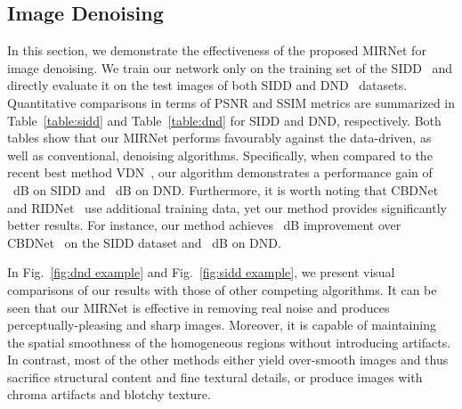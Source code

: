 \documentclass[runningheads]{llncs}
\begin{document}
\vspace{-0.4em}
\subsection{Image Denoising}
In this section, we demonstrate the effectiveness of the proposed MIRNet for image denoising.
We train our network only on the training set of the SIDD~\cite{sidd} and directly evaluate it on the test images of both SIDD and DND~\cite{dnd} datasets.
Quantitative comparisons in terms of PSNR and SSIM metrics are summarized in Table~\ref{table:sidd} and Table~\ref{table:dnd} for SIDD and DND, respectively.
Both tables show that our MIRNet performs favourably against the data-driven, as well as conventional, denoising algorithms. 
Specifically, when compared to the recent best method VDN~\cite{VDN}, our algorithm demonstrates a performance gain of ~dB on SIDD and ~dB on DND.  
Furthermore, it is worth noting that CBDNet~\cite{CBDNet} and RIDNet~\cite{RIDNet} use additional training data, yet our method provides significantly better results. For instance, our method achieves ~dB improvement over CBDNet~\cite{CBDNet} on the SIDD dataset and ~dB on DND. 




In Fig.~\ref{fig:dnd example} and Fig.~\ref{fig:sidd example}, we present visual comparisons of our results with those of other competing algorithms. 
It can be seen that our MIRNet is effective in removing real noise and produces perceptually-pleasing and sharp images.
Moreover, it is capable of maintaining the spatial smoothness of the homogeneous regions without introducing artifacts.
In contrast, most of the other methods either yield over-smooth images and thus sacrifice structural content and fine textural details, or produce images with chroma artifacts and blotchy texture.
\end{document}

